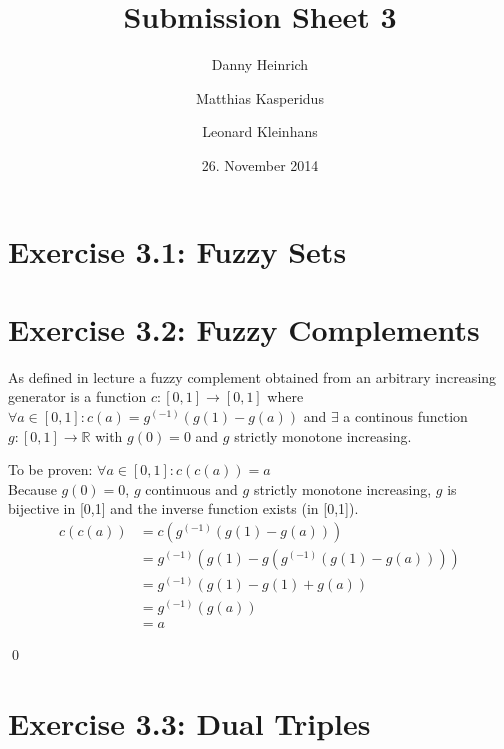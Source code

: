 \documentclass{scrartcl}
\title{Submission Sheet 3}
\author{Danny Heinrich \and Matthias Kasperidus \and Leonard Kleinhans}
\date{26. November 2014}
\begin{document}
\maketitle

\section{Exercise 3.1: Fuzzy Sets}

\section{Exercise 3.2: Fuzzy Complements}
As defined in lecture a fuzzy complement obtained from an arbitrary increasing generator is a function $c: [0,1] \to [0,1]$ where
$\forall a \in [0,1]: c(a) = g^{(-1)}\left(g(1)-g(a)\right)$ and $\exists$ a continous function $g:[0,1] \to \mathds{R}$ with $g(0) = 0$ and $g$ strictly monotone increasing.

To be proven: $\forall a \in [0,1]: c(c(a)) = a$ \\
Because $g(0) = 0$, $g$ continuous and $g$ strictly monotone increasing, $g$ is bijective in [0,1] and the inverse function exists (in [0,1]).
\begin{align*}
        c(c(a)) &= c \left( g^{(-1)} \left( g(1) - g(a) \right) \right) \\
                &= g^{(-1)} \left( g(1) - g \left( g^{(-1)} \left( g(1) - g(a) \right) \right) \right) \\
                &= g^{(-1)} \left( g(1)-g(1)+g(a) \right) \\
                &= g^{(-1)} \left( g(a) \right) \\
                &= a 
\end{align*}
    
\qed

\section{Exercise 3.3: Dual Triples}
\end{document}

